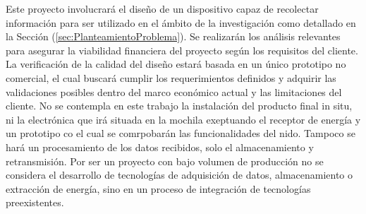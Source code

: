 Este proyecto involucrará el diseño de un dispositivo capaz de recolectar información para ser utilizado en el ámbito de la investigación como detallado en la Sección (\ref{sec:PlanteamientoProblema}). Se realizarán los análisis relevantes para asegurar la viabilidad financiera del proyecto según los requisitos del cliente. La verificación de la calidad del diseño estará basada en un único prototipo no comercial, el cual buscará cumplir los requerimientos definidos y adquirir las validaciones posibles dentro del marco económico actual y las limitaciones del cliente. 
%
No se contempla en este trabajo la instalación del producto final in situ, ni la electrónica que irá situada en la mochila exeptuando el receptor de energía y un prototipo co el cual se comrpobarán las funcionalidades del nido.
Tampoco se hará un procesamiento de los datos recibidos, solo el almacenamiento y retransmisión.
%
Por ser un proyecto con bajo volumen de producción no se considera el desarrollo de tecnologías de adquisición de datos, almacenamiento o extracción de energía, sino en un proceso de integración de tecnologías preexistentes.
%
